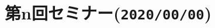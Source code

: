 \documentclass[../main]{subfiles}
\begin{document}
\section{第n回セミナー(\texttt{2020/00/00})}
\end{document}
